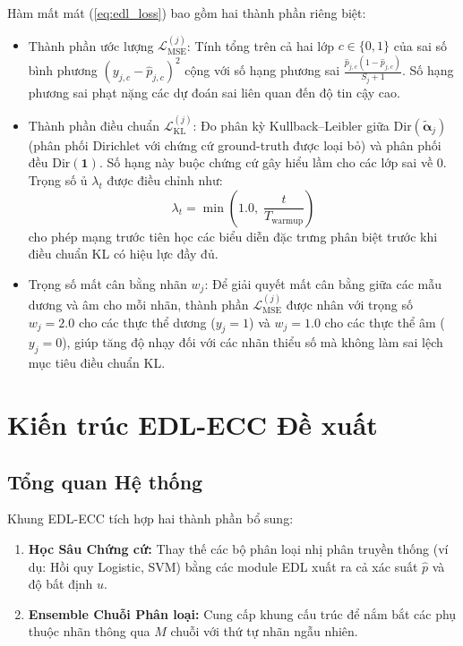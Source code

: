 \documentclass[conference]{IEEEtran}
\begin{document}
Hàm mất mát (\ref{eq:edl_loss}) bao gồm hai thành phần riêng biệt:
\begin{itemize}
    \item Thành phần ước lượng $\mathcal{L}_{\mathrm{MSE}}^{(j)}$: Tính tổng trên cả hai lớp $c \in \{0,1\}$ của sai số bình phương $(y_{j,c} - \hat{p}_{j,c})^2$ cộng với số hạng phương sai $\frac{\hat{p}_{j,c}(1-\hat{p}_{j,c})}{S_j+1}$. Số hạng phương sai phạt nặng các dự đoán sai liên quan đến độ tin cậy cao.
    \item Thành phần điều chuẩn $\mathcal{L}_{\mathrm{KL}}^{(j)}$: Đo phân kỳ Kullback--Leibler giữa $\mathrm{Dir}(\tilde{\boldsymbol{\alpha}}_j)$ (phân phối Dirichlet với chứng cứ ground-truth được loại bỏ) và phân phối đều $\mathrm{Dir}(\mathbf{1})$. Số hạng này buộc chứng cứ gây hiểu lầm cho các lớp sai về $0$. Trọng số ủ $\lambda_t$ được điều chỉnh như:
    \begin{equation}
        \lambda_t = \min\!\left(1.0,\; \frac{t}{T_{\mathrm{warmup}}}\right)
        \label{eq:lambda}
    \end{equation}
    cho phép mạng trước tiên học các biểu diễn đặc trưng phân biệt trước khi điều chuẩn KL có hiệu lực đầy đủ.
    \item Trọng số mất cân bằng nhãn $w_j$: Để giải quyết mất cân bằng giữa các mẫu dương và âm cho mỗi nhãn, thành phần $\mathcal{L}_{\mathrm{MSE}}^{(j)}$ được nhân với trọng số $w_j = 2.0$ cho các thực thể dương ($y_j = 1$) và $w_j = 1.0$ cho các thực thể âm ($y_j = 0$), giúp tăng độ nhạy đối với các nhãn thiểu số mà không làm sai lệch mục tiêu điều chuẩn KL.
\end{itemize}

\section{Kiến trúc EDL-ECC Đề xuất}

\subsection{Tổng quan Hệ thống}

Khung EDL-ECC tích hợp hai thành phần bổ sung:
\begin{enumerate}
    \item \textbf{Học Sâu Chứng cứ:} Thay thế các bộ phân loại nhị phân truyền thống (ví dụ: Hồi quy Logistic, SVM) bằng các module EDL xuất ra cả xác suất $\hat{p}$ và độ bất định $u$.
    \item \textbf{Ensemble Chuỗi Phân loại:} Cung cấp khung cấu trúc để nắm bắt các phụ thuộc nhãn thông qua $M$ chuỗi với thứ tự nhãn ngẫu nhiên.
\end{enumerate}
\end{document}
